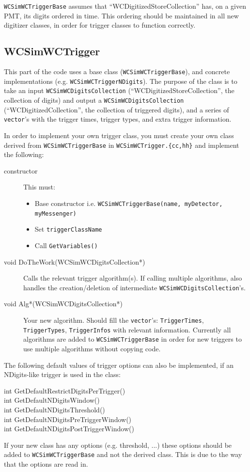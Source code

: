\texttt{WCSimWCTriggerBase} assumes that ``WCDigitizedStoreCollection'' has, on a given PMT, its digits ordered in time. This ordering should be maintained in all new digitizer classes, in order for trigger classes to function correctly.

\subsection{WCSimWCTrigger}
\label{sec:daq:trigger}

This part of the code uses a base class (\texttt{WCSimWCTriggerBase}), and concrete implementations (e.g. \texttt{WCSimWCTriggerNDigits}). The purpose of the class is to take an input \texttt{WCSimWCDigitsCollection} (``WCDigitizedStoreCollection'', the collection of digits) and output a \texttt{WCSimWCDigitsCollection} (``WCDigitizedCollection'', the collection of triggered digits), and a series of \texttt{vector}'s with the trigger times, trigger types, and extra trigger information.

In order to implement your own trigger class, you must create your own class derived from \texttt{WCSimWCTriggerBase} in \texttt{WCSimWCTrigger.\{cc,hh\}} and implement the following:
\begin{description}
\item[constructor] This must:
  \begin{itemize}
  \item Base constructor i.e. \texttt{WCSimWCTriggerBase(name, myDetector, myMessenger)}
  \item Set \texttt{triggerClassName}
  \item Call \texttt{GetVariables()}
  \end{itemize}
\item[void DoTheWork(WCSimWCDigitsCollection*)] Calls the relevant trigger algorithm(s). If calling multiple algorithms, also handles the creation/deletion of intermediate \texttt{WCSimWCDigitsCollection}'s.
\item[void Alg*(WCSimWCDigitsCollection*)] Your new algorithm. Should fill the \texttt{vector}'s: \texttt{TriggerTimes}, \texttt{TriggerTypes}, \texttt{TriggerInfos} with relevant information. Currently all algorithms are added to \texttt{WCSimWCTriggerBase} in order for new triggers to use multiple algorithms without copying code.
\end{description}
The following default values of trigger options can also be implemented, if an NDigits-like trigger is used in the class:
\begin{description}
\item[int GetDefaultRestrictDigitsPerTrigger()]
\item[int GetDefaultNDigitsWindow()]
\item[int GetDefaultNDigitsThreshold()]
\item[int GetDefaultNDigitsPreTriggerWindow()]
\item[int GetDefaultNDigitsPostTriggerWindow()]
\end{description}
If your new class has any options (e.g. threshold, ...) these options should be added to \texttt{WCSimWCTriggerBase} and not the derived class. This is due to the way that the options are read in.

